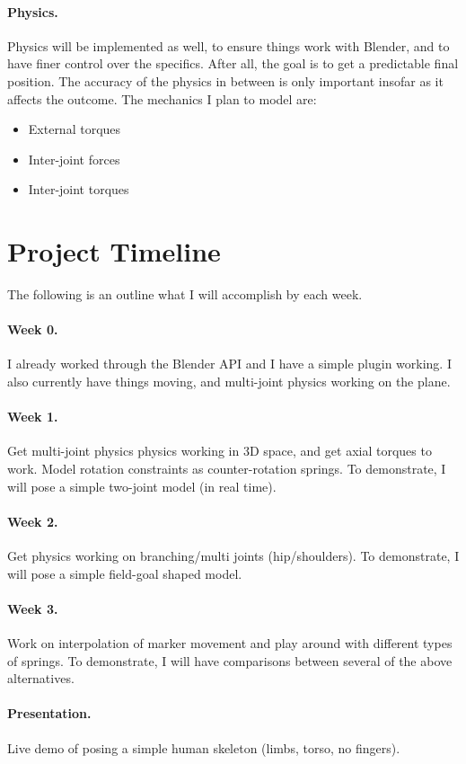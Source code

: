\documentclass[10pt,twocolumn,letterpaper]{article}
\begin{document}
\paragraph{Physics.} Physics will be implemented as well, to ensure things work with Blender, and to have finer control over the specifics. After all, the goal is to get a predictable final position. The accuracy of the physics in between is only important insofar as it affects the outcome. The mechanics I plan to model are:
\begin{itemize}
    \item External torques
    \item Inter-joint forces
    \item Inter-joint torques
\end{itemize}

\section*{Project Timeline}

The following is an outline what I will accomplish by each week.

\paragraph{Week 0.} I already worked through the Blender API and I have a simple plugin working. I also currently have things moving, and multi-joint physics working on the plane.

\paragraph{Week 1.} Get multi-joint physics physics working in 3D space, and get axial torques to work. Model rotation constraints as counter-rotation springs. To demonstrate, I will pose a simple two-joint model (in real time).

\paragraph{Week 2.} Get physics working on branching/multi joints (hip/shoulders). To demonstrate, I will pose a simple field-goal shaped model.

\paragraph{Week 3.} Work on interpolation of marker movement and play around with different types of springs. To demonstrate, I will have comparisons between several of the above alternatives.

\paragraph{Presentation.} Live demo of posing a simple human skeleton (limbs, torso, no fingers).



\end{document}
